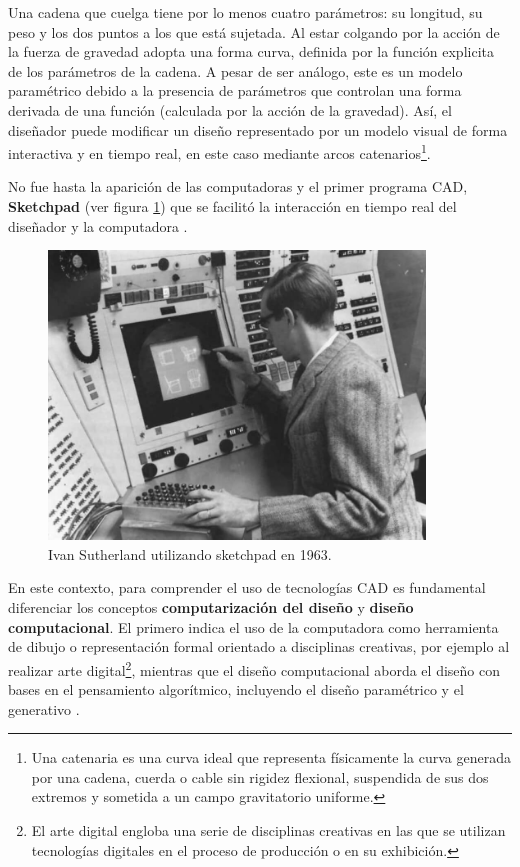 Una cadena que cuelga tiene por lo menos cuatro parámetros: su longitud, su peso y los dos puntos a los que está sujetada. Al estar colgando por la acción de la fuerza de gravedad adopta una forma curva, definida por la función explicita de los parámetros de la cadena. A pesar de ser análogo, este es un modelo paramétrico debido a la presencia de parámetros que controlan una forma derivada de una función (calculada por la acción de la gravedad). Así, el diseñador puede modificar  un diseño representado por un modelo visual de forma interactiva y en tiempo real, en este caso mediante arcos catenarios\footnote{Una catenaria es una curva ideal que representa físicamente la curva generada por una cadena, cuerda o cable sin rigidez flexional, suspendida de sus dos extremos y sometida a un campo gravitatorio uniforme.}.

No fue hasta la aparición de las computadoras y el primer programa CAD, \textbf{Sketchpad} \citep{Sutherland:1963:SMG:1461551.1461591} (ver figura \ref{img:sketchpad}) que se facilitó la interacción en tiempo real del diseñador y la computadora \citep{evolved2017}.

\begin{figure}[ht]
\includegraphics[width=10cm]{Img/GEO/geo-sketchpadc.jpg}
\centering
\caption{\footnotesize{Ivan Sutherland utilizando sketchpad en 1963.
}}
\label{img:sketchpad}
\end{figure}



En este contexto, para comprender el uso de tecnologías CAD es fundamental diferenciar  los conceptos  \textbf{computarización del diseño} y  \textbf{diseño computacional}. El primero indica el uso de la computadora como herramienta de dibujo o representación formal orientado a disciplinas creativas, por ejemplo al realizar arte digital\footnote{El arte digital engloba una serie de disciplinas creativas en las que se utilizan tecnologías digitales en el proceso de producción o en su exhibición.}, mientras que el diseño computacional aborda el diseño con bases en el pensamiento algorítmico, incluyendo el diseño paramétrico y el generativo \citep{Kaled2016}.



